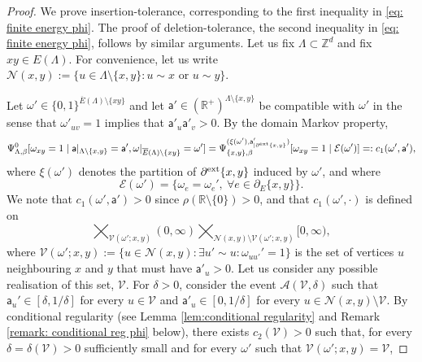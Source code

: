\documentclass[11pt,a4paper]{article}
\numberwithin{equation}{section}
\theoremstyle{plain}
\theoremstyle{definition}
\begin{document}
\begin{proof}
    We prove insertion-tolerance, corresponding to the first inequality  in \eqref{eq: finite energy phi}. The proof of deletion-tolerance, the second inequality in \eqref{eq: finite energy phi}, follows by similar arguments. Let us fix $\Lambda \subset \mathbb Z^d$ and fix $xy \in E(\Lambda)$. For convenience, let us write $\mathcal N(x,y):= \{ u \in \Lambda \setminus \{x,y\} : u \sim x \text{ or } u \sim y \}$. 
    
    Let $\omega' \in \{0,1\}^{\overline E(\Lambda)\setminus \{xy\}}$ and let $\mathsf a' \in (\mathbb R^+)^{\Lambda\setminus\{x,y\}}$ be compatible with $\omega'$ in the sense that $\omega'_{uv}=1$ implies that $\mathsf a'_u\mathsf a'_v > 0$. By the domain Markov property, 
        \begin{equation}
        \Psi^0_{\Lambda,\beta}[\omega_{xy}=1 \mid \mathsf a|_{\Lambda \setminus \{x,y\}} = \mathsf a', \omega|_{\overline E(\Lambda)\setminus \{xy\}}=\omega']
        =\Psi_{\{x,y\},\beta}^{(\xi(\omega'),\mathsf{a}'_{|\partial^{\textup{ext}}\{x,y\}})}[\omega_{xy}=1 \mid \mathcal{E}(\omega')]=:c_1(\omega',\mathsf a'),
    \end{equation}
    where $\xi(\omega')$ denotes the partition of $\partial^{\textup{ext}}\{x,y\}$ induced by $\omega'$, and where
    \begin{equation}
        \mathcal{E}(\omega')=\{\omega_e=\omega_e', \: \forall e\in \partial_E \{x,y\}\}.
    \end{equation}
    We note that $c_1(\omega',\mathsf a')>0$ since $\rho(\mathbb R\setminus \{0\})>0$, and that $c_1(\omega',\cdot)$ is defined on 
    \[\bigtimes_{\mathcal{V}(\omega';x,y)} (0,\infty)\bigtimes_{\mathcal{N}(x,y)\setminus \mathcal{V}(\omega';x,y)}[0,\infty),\] 
    where $\mathcal V(\omega';x,y) := \{ u \in \mathcal N(x,y) : \exists u'\sim u : \omega_{uu'}'=1 \}$ is the set of vertices $u$ neighbouring $x$ and $y$ that must have $\mathsf a'_u>0$. Let us consider any possible realisation of this set, $\mathcal V$. For $\delta > 0$, consider the event $\mathcal A(\mathcal V, \delta)$ such that $\mathsf a_u' \in [\delta,1/\delta]$ for every $u \in \mathcal V$ and $\mathsf a'_u \in [0,1/\delta]$ for every $u \in \mathcal N(x,y)\setminus \mathcal V$. By conditional regularity (see Lemma \ref{lem:conditional regularity} and Remark \ref{remark: conditional reg phi} below), there exists $c_2(\mathcal V)>0$ such that, for every $\delta=\delta(\mathcal V) > 0$ sufficiently small and for every $\omega'$ such that $\mathcal V(\omega';x,y)=\mathcal V$,

\end{proof}
\end{document}
